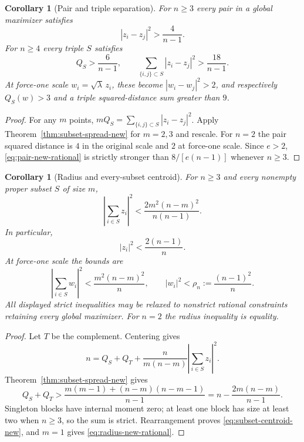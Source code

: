\documentclass[11pt]{article}
\newtheorem{corollary}[theorem]{Corollary}
\theoremstyle{remark}
\numberwithin{equation}{section}
\begin{document}
\begin{corollary}[Pair and triple separation]\label{cor:pair-triple-new}
For $n\ge3$ every pair in a global maximizer satisfies
\begin{equation}\label{eq:pair-new-rational}
                    |z_i-z_j|^2>\frac4{n-1}.
\end{equation}
For $n\ge4$ every triple $S$ satisfies
\begin{equation}\label{eq:triple-new-rational}
 Q_S>\frac6{n-1},\qquad
 \sum_{\{i,j\}\subset S}|z_i-z_j|^2>\frac{18}{n-1}.
\end{equation}
At force-one scale $w_i=\sqrt\lambda\,z_i$, these become
$|w_i-w_j|^2>2$, and respectively $Q_S(w)>3$ and a triple
squared-distance sum greater than $9$.
\end{corollary}
\begin{proof}
For any $m$ points,
$mQ_S=\sum_{\{i,j\}\subset S}|z_i-z_j|^2$.
Apply Theorem~\ref{thm:subset-spread-new} for $m=2,3$ and rescale.
For $n=2$ the pair squared distance is $4$ in the original scale and
$2$ at force-one scale. Since $e>2$, \eqref{eq:pair-new-rational}
is strictly stronger than $8/[e(n-1)]$ whenever $n\ge3$.
\end{proof}

\begin{corollary}[Radius and every-subset centroid]\label{cor:subset-centroid-new}
For $n\ge3$ and every nonempty proper subset $S$ of size $m$,
\begin{equation}\label{eq:subset-centroid-new}
 \left|\sum_{i\in S}z_i\right|^2
      <\frac{2m^2(n-m)^2}{n(n-1)}.
\end{equation}
In particular,
\begin{equation}\label{eq:radius-new-rational}
                    |z_i|^2<\frac{2(n-1)}n.
\end{equation}
At force-one scale the bounds are
\[
 \left|\sum_{i\in S}w_i\right|^2
       <\frac{m^2(n-m)^2}{n},\qquad
 |w_i|^2<\rho_n:=\frac{(n-1)^2}{n}.
\]
All displayed strict inequalities may be relaxed to nonstrict rational
constraints retaining every global maximizer. For $n=2$ the radius
inequality is equality.
\end{corollary}
\begin{proof}
Let $T$ be the complement. Centering gives
\[
 n=Q_S+Q_T+\frac{n}{m(n-m)}
                    \left|\sum_{i\in S}z_i\right|^2.
\]
Theorem~\ref{thm:subset-spread-new} gives
\[
 Q_S+Q_T>
 \frac{m(m-1)+(n-m)(n-m-1)}{n-1}
 =n-\frac{2m(n-m)}{n-1}.
\]
Singleton blocks have internal moment zero; at least one block has
size at least two when $n\ge3$, so the sum is strict. Rearrangement
proves \eqref{eq:subset-centroid-new}, and $m=1$ gives
\eqref{eq:radius-new-rational}.
\end{proof}
\end{document}
